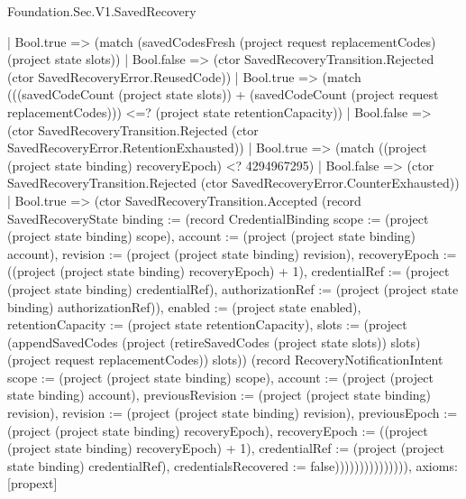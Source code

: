 \begin{lexlean}{Foundation.Sec.V1.SavedRecovery}
\begin{semanticmodule}
{                      | Bool.true => (match (savedCodesFresh (project request replacementCodes) (project state slots))
                        | Bool.false => (ctor SavedRecoveryTransition.Rejected (ctor SavedRecoveryError.ReusedCode))
                        | Bool.true => (match (((savedCodeCount (project state slots)) + (savedCodeCount (project request replacementCodes))) <=? (project state retentionCapacity))
                          | Bool.false => (ctor SavedRecoveryTransition.Rejected (ctor SavedRecoveryError.RetentionExhausted))
                          | Bool.true => (match ((project (project state binding) recoveryEpoch) <? 4294967295)
                            | Bool.false => (ctor SavedRecoveryTransition.Rejected (ctor SavedRecoveryError.CounterExhausted))
                            | Bool.true => (ctor SavedRecoveryTransition.Accepted (record SavedRecoveryState {binding := (record CredentialBinding {scope := (project (project state binding) scope), account := (project (project state binding) account), revision := (project (project state binding) revision), recoveryEpoch := ((project (project state binding) recoveryEpoch) + 1), credentialRef := (project (project state binding) credentialRef), authorizationRef := (project (project state binding) authorizationRef)}), enabled := (project state enabled), retentionCapacity := (project state retentionCapacity), slots := (project (appendSavedCodes (project (retireSavedCodes (project state slots)) slots) (project request replacementCodes)) slots)}) (record RecoveryNotificationIntent {scope := (project (project state binding) scope), account := (project (project state binding) account), previousRevision := (project (project state binding) revision), revision := (project (project state binding) revision), previousEpoch := (project (project state binding) recoveryEpoch), recoveryEpoch := ((project (project state binding) recoveryEpoch) + 1), credentialRef := (project (project state binding) credentialRef), credentialsRecovered := false}))))))))))))))),
  axioms: [propext]
}
\end{semanticmodule}
\end{lexlean}
